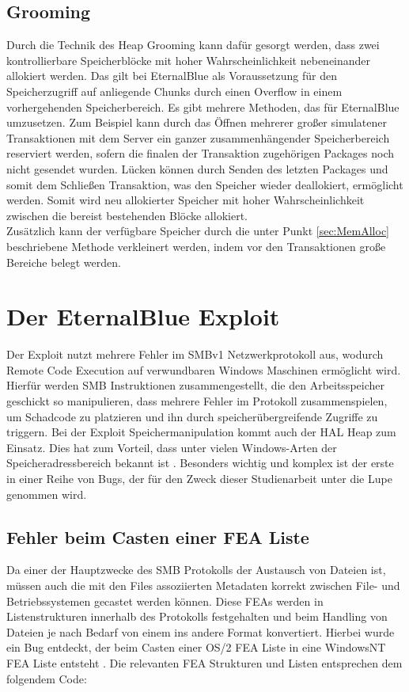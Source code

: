 \documentclass[DIV=12,headings=normal,pdftex,headinclude=false,footinclude=false,final]{scrreprt}
\begin{document}
\section{Grooming}\label{sec:Grooming}
Durch die Technik des Heap Grooming kann dafür gesorgt werden, dass zwei kontrollierbare Speicherblöcke mit hoher Wahrscheinlichkeit nebeneinander allokiert werden. Das gilt bei EternalBlue als Voraussetzung für den Speicherzugriff auf anliegende Chunks durch einen Overflow in einem vorhergehenden Speicherbereich. Es gibt mehrere Methoden, das für EternalBlue umzusetzen. Zum Beispiel kann durch das Öffnen mehrerer großer simulatener Transaktionen mit dem Server ein ganzer zusammenhängender Speicherbereich reserviert werden, sofern die finalen der Transaktion zugehörigen Packages  noch nicht gesendet wurden\cite{}. Lücken können durch Senden des letzten Packages und somit dem Schließen Transaktion, was den Speicher wieder deallokiert, ermöglicht werden. Somit wird neu allokierter Speicher mit hoher Wahrscheinlichkeit zwischen die bereist bestehenden Blöcke allokiert.\\ Zusätzlich kann der verfügbare Speicher durch die unter Punkt \ref{sec:MemAlloc} beschriebene Methode verkleinert werden, indem vor den Transaktionen große Bereiche belegt werden.


\chapter{Der EternalBlue Exploit}
Der Exploit nutzt mehrere Fehler im SMBv1 Netzwerkprotokoll aus, wodurch Remote Code Execution auf verwundbaren Windows Maschinen ermöglicht wird.\\ Hierfür werden SMB Instruktionen zusammengestellt, die den Arbeitsspeicher geschickt so manipulieren, dass mehrere Fehler im Protokoll zusammenspielen, um Schadcode zu platzieren und ihn durch speicherübergreifende Zugriffe zu triggern\cite{Medium}. Bei der Exploit Speichermanipulation kommt auch der HAL Heap zum Einsatz. Dies hat zum Vorteil, dass unter vielen Windows-Arten der Speicheradressbereich bekannt ist \cite{GH:FEA}. Besonders wichtig und komplex ist der erste in einer Reihe von Bugs, der für den Zweck dieser Studienarbeit unter die Lupe genommen wird.

\section{Fehler beim Casten einer FEA Liste}\label{sec:FEA_Cast}
Da einer der Hauptzwecke des SMB Protokolls der Austausch von Dateien ist, müssen auch die mit den Files assoziierten Metadaten korrekt zwischen File- und Betriebssystemen gecastet werden können. Diese FEAs werden in Listenstrukturen innerhalb des Protokolls festgehalten und beim Handling von Dateien je nach Bedarf von einem ins andere Format konvertiert. Hierbei wurde ein Bug entdeckt, der beim Casten einer OS/2 FEA Liste in eine WindowsNT FEA Liste entsteht \cite{TM:EB}. Die relevanten FEA Strukturen und Listen entsprechen dem folgendem Code:\\
\end{document}
